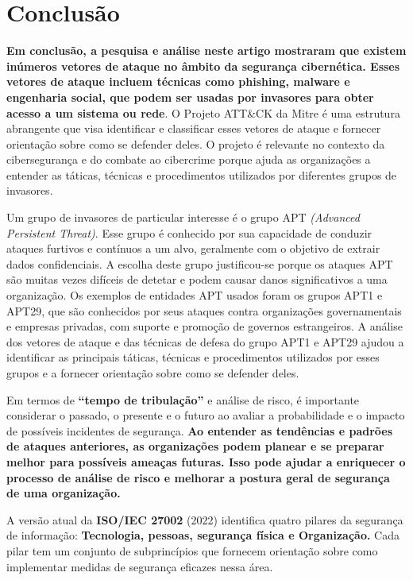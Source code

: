 \chapter{Conclusão}

\textbf{Em conclusão, a pesquisa e análise neste artigo mostraram que existem inúmeros vetores de ataque no âmbito da segurança cibernética. Esses vetores de ataque incluem técnicas como phishing, malware e engenharia social, que podem ser usadas por invasores para obter acesso a um sistema ou rede}. O Projeto ATT\&CK da Mitre é uma estrutura abrangente que visa identificar e classificar esses vetores de ataque e fornecer orientação sobre como se defender deles. O projeto é relevante no contexto da cibersegurança e do combate ao cibercrime porque ajuda as organizações a entender as táticas, técnicas e procedimentos utilizados por diferentes grupos de invasores.

Um grupo de invasores de particular interesse é o grupo APT \textit{(Advanced Persistent Threat)}. Esse grupo é conhecido por sua capacidade de conduzir ataques furtivos e contínuos a um alvo, geralmente com o objetivo de extrair dados confidenciais. A escolha deste grupo justificou-se porque os ataques APT são muitas vezes difíceis de detetar e podem causar danos significativos a uma organização. Os exemplos de entidades APT usados foram os grupos APT1 e APT29, que são conhecidos por seus ataques contra organizações governamentais e empresas privadas, com suporte e promoção de governos estrangeiros. A análise dos vetores de ataque e das técnicas de defesa do grupo APT1 e APT29 ajudou a identificar as principais táticas, técnicas e procedimentos utilizados por esses grupos e a fornecer orientação sobre como se defender deles.

Em termos de \textbf{``tempo de tribulação''} e análise de risco, é importante considerar o passado, o presente e o futuro ao avaliar a probabilidade e o impacto de possíveis incidentes de segurança. \textbf{Ao entender as tendências e padrões de ataques anteriores, as organizações podem planear e se preparar melhor para possíveis ameaças futuras. Isso pode ajudar a enriquecer o processo de análise de risco e melhorar a postura geral de segurança de uma organização.}

A versão atual da \textbf{ISO/IEC 27002} (2022) identifica quatro pilares da segurança de informação: \textbf{Tecnologia, pessoas, segurança física e Organização.} Cada pilar tem um conjunto de subprincípios que fornecem orientação sobre como implementar medidas de segurança eficazes nessa área.

